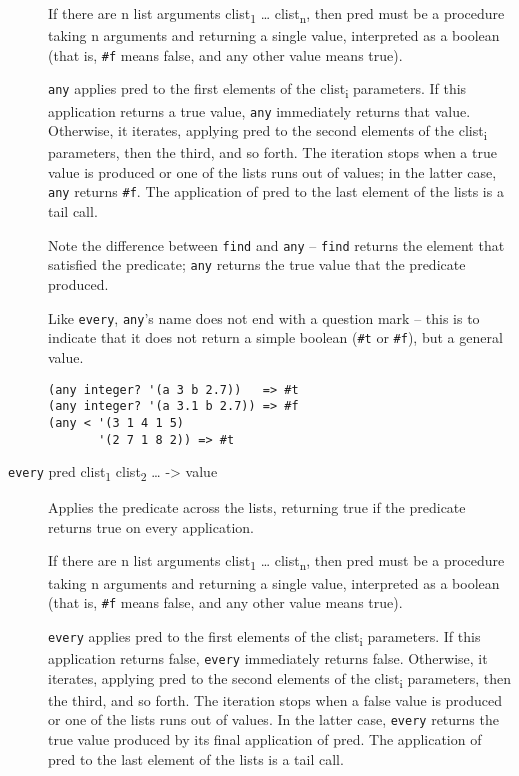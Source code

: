 \begin{description}
If there are n list arguments clist\textsubscript{1} \ldots{}
clist\textsubscript{n}, then pred must be a procedure taking n arguments
and returning a single value, interpreted as a boolean (that is,
\texttt{\#f} means false, and any other value means true).

\texttt{any} applies pred to the first elements of the
clist\textsubscript{i} parameters. If this application returns a true
value, \texttt{any} immediately returns that value. Otherwise, it
iterates, applying pred to the second elements of the
clist\textsubscript{i} parameters, then the third, and so forth. The
iteration stops when a true value is produced or one of the lists runs
out of values; in the latter case, \texttt{any} returns \texttt{\#f}.
The application of pred to the last element of the lists is a tail call.

Note the difference between \texttt{find} and \texttt{any} --
\texttt{find} returns the element that satisfied the predicate;
\texttt{any} returns the true value that the predicate produced.

Like \texttt{every}, \texttt{any}'s name does not end with a question
mark -- this is to indicate that it does not return a simple boolean
(\texttt{\#t} or \texttt{\#f}), but a general value.

\begin{verbatim}
(any integer? '(a 3 b 2.7))   => #t
(any integer? '(a 3.1 b 2.7)) => #f
(any < '(3 1 4 1 5)
       '(2 7 1 8 2)) => #t
\end{verbatim}
\item[ \href{}{} \texttt{every} pred clist\textsubscript{1}
clist\textsubscript{2} \ldots{} -\textgreater{} value ]
Applies the predicate across the lists, returning true if the predicate
returns true on every application.

If there are n list arguments clist\textsubscript{1} \ldots{}
clist\textsubscript{n}, then pred must be a procedure taking n arguments
and returning a single value, interpreted as a boolean (that is,
\texttt{\#f} means false, and any other value means true).

\texttt{every} applies pred to the first elements of the
clist\textsubscript{i} parameters. If this application returns false,
\texttt{every} immediately returns false. Otherwise, it iterates,
applying pred to the second elements of the clist\textsubscript{i}
parameters, then the third, and so forth. The iteration stops when a
false value is produced or one of the lists runs out of values. In the
latter case, \texttt{every} returns the true value produced by its final
application of pred. The application of pred to the last element of the
lists is a tail call.


\end{description}
